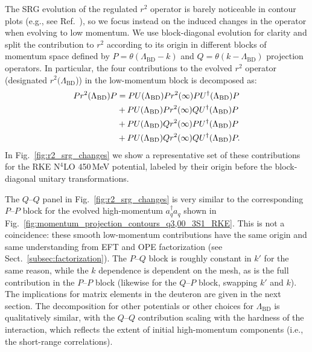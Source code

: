 \documentclass[10pt,aps,prc,floatfix,twocolumn,nofootinbib]{revtex4-1}
\newcommand{\LambdaBD}{{\Lambda_{\text{BD}}}}
\newcommand{\ataq}{a^{\dagger}_q a_q}
\newcommand{\PP}{\ensuremath{P\mbox{--}P}}
\newcommand{\PQ}{\ensuremath{P\mbox{--}Q}}
\newcommand{\QP}{\ensuremath{Q\mbox{--}P}}
\newcommand{\QQ}{\ensuremath{Q\mbox{--}Q}}
\begin{document}
The SRG evolution of the regulated $r^2$ operator is barely noticeable in contour plots (e.g., see Ref.~\cite{Anderson:2010aq}), so we focus instead on the induced changes in the operator when evolving to low momentum.
We use block-diagonal evolution for clarity and split the contribution to $r^2$ according to its origin in different blocks of momentum space defined by $P = \theta (\LambdaBD - k)$ and $Q = \theta(k - \LambdaBD)$ projection operators.
In particular, the four contributions to the evolved $r^2$ operator (designated $r^2(\LambdaBD$)) in the low-momentum block is decomposed as:
%
\begin{align}
    \label{eq:r2_PP_contributions}
    P r^2(\LambdaBD) P &= P U(\LambdaBD) P r^2(\infty) P U^{\dagger}(\LambdaBD) P \nonumber \\
    & \null + P U(\LambdaBD) P r^2(\infty) Q U^{\dagger}(\LambdaBD) P \nonumber \\
    & \null + P U(\LambdaBD) Q r^2(\infty) P U^{\dagger}(\LambdaBD) P \nonumber \\
    & \null + P U(\LambdaBD) Q r^2(\infty) Q U^{\dagger}(\LambdaBD) P.
\end{align}
%
In Fig.~\ref{fig:r2_srg_changes} we show a representative set of these contributions for the RKE N$^4$LO 450\,MeV potential, labeled by their origin before the block-diagonal unitary transformations.


The $\QQ$ panel in Fig.~\ref{fig:r2_srg_changes} is very similar to the corresponding $\PP$ block for the evolved high-momentum $\ataq$ shown in Fig.~\ref{fig:momentum_projection_contours_q3,00_3S1_RKE}.
This is not a coincidence: these smooth low-momentum contributions have the same origin and same understanding from EFT and OPE factorization (see Sect.~\ref{subsec:factorization}).
The $\PQ$ block is roughly constant in $k'$ for the same reason, while the $k$ dependence is dependent on the mesh, as is the full contribution in the $\PP$ block (likewise for the $\QP$ block, swapping $k'$ and $k$).
The implications for matrix elements in the deuteron are given in the next section.
The decomposition for other potentials or other choices for $\LambdaBD$ is qualitatively similar, with the $\QQ$ contribution scaling with the hardness of the interaction, which reflects the extent of initial high-momentum components (i.e., the short-range correlations).
\end{document}
